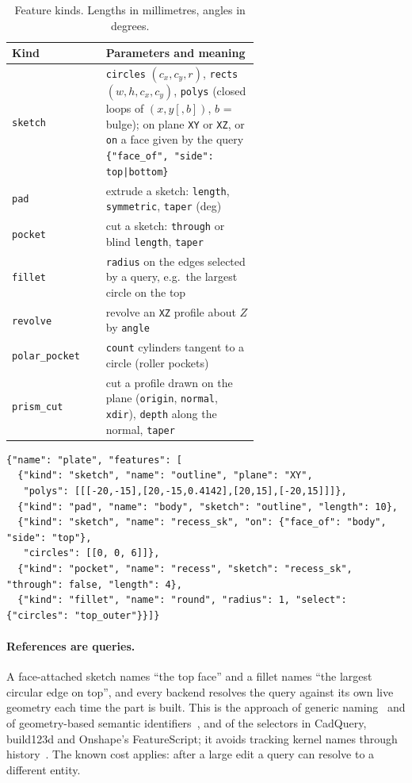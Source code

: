 \documentclass[11pt]{article}
\newcommand{\code}[1]{\texttt{\small #1}}
\begin{document}
\begin{table}[t]
\centering\small
\begin{tabular}{@{}lp{0.62\linewidth}@{}}
\toprule
Kind & Parameters and meaning \\
\midrule
\code{sketch} & \code{circles} $(c_x,c_y,r)$, \code{rects} $(w,h,c_x,c_y)$, \code{polys}
  (closed loops of $(x,y[,b])$, $b$ = bulge); on plane \code{XY} or \code{XZ}, or
  \code{on} a face given by the query \code{\{"face\_of", "side": top|bottom\}} \\
\code{pad} & extrude a sketch: \code{length}, \code{symmetric}, \code{taper} (deg) \\
\code{pocket} & cut a sketch: \code{through} or blind \code{length}, \code{taper} \\
\code{fillet} & \code{radius} on the edges selected by a query, e.g.\ the largest circle on the top \\
\code{revolve} & revolve an \code{XZ} profile about $Z$ by \code{angle} \\
\code{polar\_pocket} & \code{count} cylinders tangent to a circle (roller pockets) \\
\code{prism\_cut} & cut a profile drawn on the plane (\code{origin}, \code{normal}, \code{xdir}), \code{depth} along the normal, \code{taper} \\
\bottomrule
\end{tabular}
\caption{Feature kinds. Lengths in millimetres, angles in degrees.}
\label{tab:kinds}
\end{table}

\begin{lstlisting}[caption={A complete part: a plate, a pocket in its top face, and a fillet.},label={lst:ir},float=t]
{"name": "plate", "features": [
  {"kind": "sketch", "name": "outline", "plane": "XY",
   "polys": [[[-20,-15],[20,-15,0.4142],[20,15],[-20,15]]]},
  {"kind": "pad", "name": "body", "sketch": "outline", "length": 10},
  {"kind": "sketch", "name": "recess_sk", "on": {"face_of": "body", "side": "top"},
   "circles": [[0, 0, 6]]},
  {"kind": "pocket", "name": "recess", "sketch": "recess_sk", "through": false, "length": 4},
  {"kind": "fillet", "name": "round", "radius": 1, "select": {"circles": "top_outer"}}]}
\end{lstlisting}

\paragraph{References are queries.} A face-attached sketch names ``the top face''
and a fillet names ``the largest circular edge on top'', and every backend
resolves the query against its own live geometry each time the part is built.
This is the approach of generic naming~\cite{capoyleas1996generic} and of
geometry-based semantic identifiers~\cite{wang2005geometry}, and of the selectors
in CadQuery, build123d and Onshape's FeatureScript; it avoids tracking kernel
names through history~\cite{kripac1997mechanism,marcheix2002survey}. The known
cost applies: after a large edit a query can resolve to a different entity.
\end{document}

